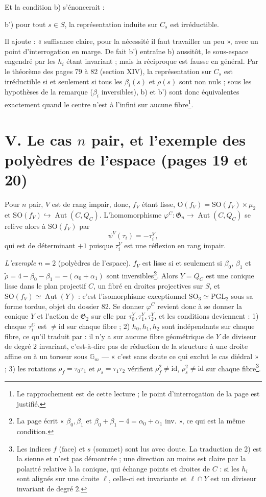 \documentclass[11pt,a4paper]{article}
\begin{document}
Et la condition b) s'énoncerait :

b') pour tout $s \in S$, la représentation induite sur $C_s$ est
irréductible.

Il ajoute : « suffisance claire, pour la nécessité il faut travailler un peu »,
avec un point d'interrogation en marge. De fait b') entraîne b) aussitôt, le
sous-espace engendré par les $h_i$ étant invariant ; mais la réciproque est
fausse en général. Par le théorème des pages 79 à 82 (section XIV), la
représentation sur $C_s$ est irréductible si et seulement si tous les
$\beta_i(s)$ et $\rho(s)$ sont non nuls ; sous les hypothèses de la remarque
($\beta_i$ inversibles), b) et b') sont donc équivalentes exactement quand le
centre n'est à l'infini sur aucune fibre\footnote{Le rapprochement est de
cette lecture ; le point d'interrogation de la page est justifié.}.

\section*{V. Le cas $n$ pair, et l'exemple des polyèdres de l'espace (pages 19 et 20)}

Pour $n$ pair, $V$ est de rang impair, donc, $f_V$ étant lisse, $\mathrm{O}(f_V)
= \mathrm{SO}(f_V) \times \mu_2$ et $\mathrm{SO}(f_V) \hookrightarrow
\operatorname{Aut}(C, Q_C)$. L'homomorphisme $\varphi^C \colon
\mathfrak{G}_n \to \operatorname{Aut}(C, Q_C)$ se relève alors à
$\mathrm{SO}(f_V)$ par
\[
\psi^V(\tau_i) = -\tau_i^V ,
\]
qui est de déterminant $+1$ puisque $\tau_i^V$ est une réflexion en rang
impair.

\emph{L'exemple $n = 2$} (polyèdres de l'espace). $f_V$ est lisse si et
seulement si $\beta_0$, $\beta_1$ et $\tilde\rho = 4 - \beta_0 - \beta_1 =
-(\alpha_0 + \alpha_1)$ sont inversibles\footnote{La page écrit « $\beta_0,
\beta_1$ et $\beta_0 + \beta_1 - 4 = \alpha_0 + \alpha_1$ inv. », ce qui est
la même condition.}. Alors $Y = Q_C$ est une conique lisse dans le plan
projectif $C$, un fibré en droites projectives sur $S$, et $\mathrm{SO}(f_V)
\simeq \underline{\operatorname{Aut}}(Y)$ : c'est l'isomorphisme exceptionnel
$\mathrm{SO}_3 \simeq \mathrm{PGL}_2$ sous sa forme tordue, objet du dossier 82.
Se donner $\varphi^C$ revient donc à se donner la conique $Y$ et l'action de
$\mathfrak{G}_2$ sur elle par $\tau^Y_0, \tau^Y_1, \tau^Y_2$, et les conditions
deviennent : 1) chaque $\tau_i^C$ est $\neq \mathrm{id}$ sur chaque fibre ;
2) $h_0, h_1, h_2$ sont indépendants sur chaque fibre, ce qu'il traduit par :
il n'y a sur aucune fibre géométrique de $Y$ de diviseur de degré $2$
invariant, c'est-à-dire pas de réduction de la structure à une droite affine
ou à un torseur sous $\mathbb{G}_m$ --- « c'est sans doute ce qui exclut le cas
diédral » ; 3) les rotations $\rho_f = \tau_0\tau_1$ et $\rho_s = \tau_1\tau_2$
vérifient $\rho_f^2 \neq \mathrm{id}$, $\rho_s^2 \neq
\mathrm{id}$ sur chaque fibre\footnote{Les indices $f$ (face) et $s$ (sommet)
sont lus avec doute. La traduction de 2) est la sienne et n'est pas
démontrée ; une direction au moins est claire par la polarité relative à la
conique, qui échange points et droites de $C$ : si les $h_i$ sont alignés sur
une droite $\ell$, celle-ci est invariante et $\ell \cap Y$ est un diviseur
invariant de degré $2$.}.
\end{document}
